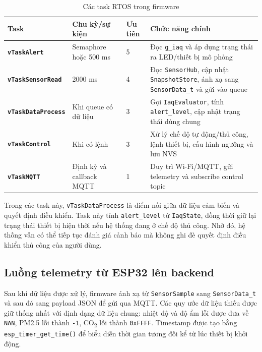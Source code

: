 \begin{table}[H]
    \centering
    \caption{Các task RTOS trong firmware}
    \begin{tabularx}{\textwidth}{>{\bfseries}l l l X}
        \toprule
        Task & Chu kỳ/sự kiện & Ưu tiên & Chức năng chính \\
        \midrule
        \texttt{vTaskAlert} & Semaphore hoặc 500 ms & 5 & Đọc \texttt{g\_iaq} và áp dụng trạng thái ra LED/thiết bị mô phỏng \\
        \texttt{vTaskSensorRead} & 2000 ms & 4 & Đọc \texttt{SensorHub}, cập nhật \texttt{SnapshotStore}, ánh xạ sang \texttt{SensorData\_t} và gửi vào queue \\
        \texttt{vTaskDataProcess} & Khi queue có dữ liệu & 3 & Gọi \texttt{IaqEvaluator}, tính \texttt{alert\_level}, cập nhật trạng thái dùng chung \\
        \texttt{vTaskControl} & Khi có lệnh & 3 & Xử lý chế độ tự động/thủ công, lệnh thiết bị, cấu hình ngưỡng và lưu NVS \\
        \texttt{vTaskMQTT} & Định kỳ và callback MQTT & 1 & Duy trì Wi-Fi/MQTT, gửi telemetry và subscribe control topic \\
        \bottomrule
    \end{tabularx}
\end{table}

Trong các task này, \texttt{vTaskDataProcess} là điểm nối giữa dữ liệu cảm biến và quyết
định điều khiển. Task này tính \texttt{alert\_level} từ \texttt{IaqState}, đồng thời giữ
lại trạng thái thiết bị hiện thời nếu hệ thống đang ở chế độ thủ công. Nhờ đó, hệ thống vẫn
có thể tiếp tục đánh giá cảnh báo mà không ghi đè quyết định điều khiển thủ công của
người dùng.

\subsection{Luồng telemetry từ ESP32 lên backend}

Sau khi dữ liệu được xử lý, firmware ánh xạ từ \texttt{SensorSample} sang
\texttt{SensorData\_t} và sau đó sang payload JSON để gửi qua MQTT. Các quy ước dữ
liệu thiếu được giữ thống nhất với định dạng dữ liệu chung: nhiệt độ và độ ẩm lỗi được đưa về
\texttt{NAN}, PM2.5 lỗi thành \texttt{-1}, CO\textsubscript{2} lỗi thành \texttt{0xFFFF}.
Timestamp được tạo bằng \texttt{esp\_timer\_get\_time()} để biểu diễn thời gian tương đối
kể từ lúc thiết bị khởi động.


